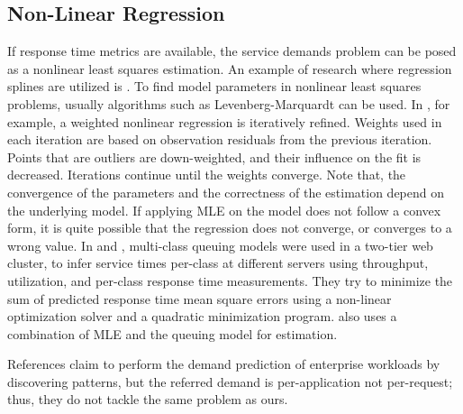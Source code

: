  \subsection{Non-Linear Regression}
If response time metrics are available, the service demands problem can be posed as a nonlinear least squares estimation. 
  An example of research where regression splines are utilized is \cite{courtois_using_2000}. To find model parameters in nonlinear least squares problems, usually algorithms such as Levenberg-Marquardt \cite{wild_nonlinear_2003,dumouchel1989integrating} can be used. In \cite{dumouchel1989integrating}, for example, a weighted nonlinear regression is iteratively refined. Weights used in each
  iteration are based on observation residuals from the previous iteration. Points that are outliers are down-weighted, and their influence on the fit is decreased. Iterations continue until the weights converge. Note that, the convergence of the parameters and the correctness of the estimation depend on the underlying model. If applying MLE on the model does not follow a convex form, it is quite possible that the regression does not converge, or converges to a wrong value.  
% 
	In \cite{zhang_workload_2002} and \cite{liu_parameter_2006}, multi-class queuing models were used in a two-tier web cluster, to infer service times per-class at different servers using throughput, utilization, and per-class response time measurements. They try to minimize the sum of predicted response time mean square errors using a non-linear optimization solver and a quadratic minimization program. \cite{kraft_estimating_2009} also uses a combination of MLE and the queuing model for estimation.  

 References \cite{gmach_workload_2007,gmach_capacity_2007} claim to perform the demand prediction of enterprise workloads by discovering patterns, but the referred demand is per-application not per-request; thus, they do not tackle the same problem as ours. 
 
